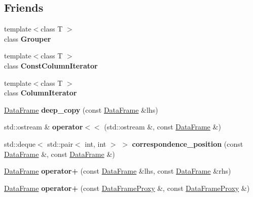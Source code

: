 \subsection*{Friends}
\begin{DoxyCompactItemize}
\item 
\mbox{\label{classDataFrame_a6d45f85447b7949ec8832150ebaf26cc}} 
{\footnotesize template$<$class T $>$ }\\class {\bfseries Grouper}
\item 
\mbox{\label{classDataFrame_a323c4435dd5a1b8a480b46dd8f16c77c}} 
{\footnotesize template$<$class T $>$ }\\class {\bfseries Const\+Column\+Iterator}
\item 
\mbox{\label{classDataFrame_a59406b6236833847c91e20e36a3983c9}} 
{\footnotesize template$<$class T $>$ }\\class {\bfseries Column\+Iterator}
\item 
\mbox{\label{classDataFrame_ac665e1df1c1d41e0d0c5afcdfb827a74}} 
\hyperlink{classDataFrame}{Data\+Frame} {\bfseries deep\+\_\+copy} (const \hyperlink{classDataFrame}{Data\+Frame} \&lhs)
\item 
\mbox{\label{classDataFrame_a7372e1909f73624de2939188c8b407bd}} 
std\+::ostream \& {\bfseries operator$<$$<$} (std\+::ostream \&, const \hyperlink{classDataFrame}{Data\+Frame} \&)
\item 
\mbox{\label{classDataFrame_a9eddb94ec11871497eb1ecbd4b9d781d}} 
std\+::deque$<$ std\+::pair$<$ int, int $>$ $>$ {\bfseries correspondence\+\_\+position} (const \hyperlink{classDataFrame}{Data\+Frame} \&, const \hyperlink{classDataFrame}{Data\+Frame} \&)
\item 
\mbox{\label{classDataFrame_a1b618c630383343b0476d4b2ee3892ba}} 
\hyperlink{classDataFrame}{Data\+Frame} {\bfseries operator+} (const \hyperlink{classDataFrame}{Data\+Frame} \&lhs, const \hyperlink{classDataFrame}{Data\+Frame} \&rhs)
\item 
\mbox{\label{classDataFrame_ac7252ac5b8145feb97ce0b16040cdbde}} 
\hyperlink{classDataFrame}{Data\+Frame} {\bfseries operator+} (const \hyperlink{classDataFrame_1_1DataFrameProxy}{Data\+Frame\+Proxy} \&, const \hyperlink{classDataFrame_1_1DataFrameProxy}{Data\+Frame\+Proxy} \&)

\end{DoxyCompactItemize}
